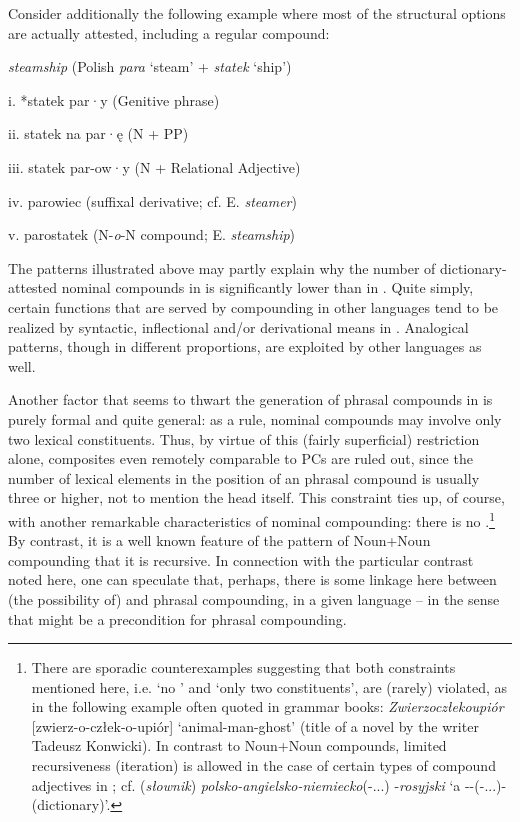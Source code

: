 \documentclass[output=paper]{LSP/langsci}
\begin{document}
Consider additionally the following example where most of the structural options are actually attested, including a regular compound:

\ea\label{szymanek:11} 
{\textit{steamship}}  {(Polish} {\textit{para}} {‘steam’ +} {\textit{statek}} {‘ship’)}

 {i.     *statek par}·{y  (Genitive phrase)}


 {ii.   statek na par}·{ę  (N + PP)}

 {iii.   statek par-ow}·{y  (N + Relational Adjective)}

 {iv.   parowiec    (suffixal derivative; cf. E.} {\textit{steamer}})

 {v.   parostatek  (N-}{\textit{o}}{-N compound; E.} {\textit{steamship}})
\z

\largerpage[2]
The patterns illustrated above may partly explain why the number of dic\-tio\-nary-attested nominal compounds in  is significantly lower than in . Quite simply, certain functions that are served by compounding in other languages tend to be realized by syntactic, inflectional and/or derivational means in . Analogical patterns, though in different proportions, are exploited by other  languages as well. 

{Another factor that seems to thwart the generation of phrasal compounds in  is purely formal and quite general: as a rule,  nominal compounds may involve only two lexical constituents. Thus, by virtue of this (fairly superficial) restriction alone, composites even remotely comparable to  PCs are ruled out, since the number of lexical elements in the  position of an  phrasal compound is usually three or higher, not to mention the head itself. This constraint ties up, of course, with another remarkable characteristics of  nominal compounding: there is no .}\footnote{{There are sporadic counterexamples suggesting that both constraints mentioned here, i.e. ‘no ’ and ‘only two constituents’, are (rarely) violated, as in the following example often quoted in grammar books:} {\textit{Zwierzoczłekoupiór}} {[zwierz-o-człek-o-upiór] ‘animal-man-ghost’ (title of a novel by the  writer Tadeusz Konwicki). In contrast to Noun+Noun compounds, limited recursiveness (iteration) is allowed in the case of certain types of compound adjectives in ; cf.} ({\textit{słownik}}) {\textit{polsko-angielsko-niemiecko}}{(-...) -}{\textit{rosyjski}} {‘a --(-...)- (dictionary)’.}} {By contrast, it is a well known feature of the  pattern of Noun+Noun compounding that it is recursive. In connection with the particular contrast noted here, one can speculate that, perhaps, there is some linkage here between (the possibility of)  and phrasal compounding, in a given language – in the sense that  might be a precondition for phrasal compounding.}
\end{document}
